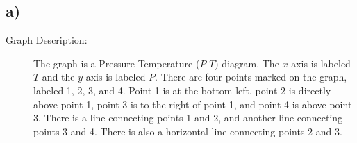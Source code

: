 

\subsection*{a)}
\begin{description}
    \item[Graph Description:] The graph is a Pressure-Temperature ($P$-$T$) diagram. The $x$-axis is labeled $T$ and the $y$-axis is labeled $P$. There are four points marked on the graph, labeled 1, 2, 3, and 4. Point 1 is at the bottom left, point 2 is directly above point 1, point 3 is to the right of point 1, and point 4 is above point 3. There is a line connecting points 1 and 2, and another line connecting points 3 and 4. There is also a horizontal line connecting points 2 and 3.
\end{description}